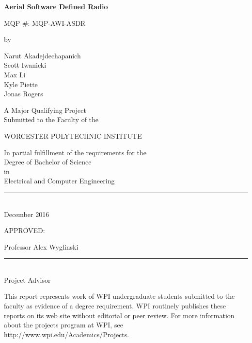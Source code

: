 \documentclass[12pt]{report}
\begin{document}
	
	
	
	\newcommand{\brk}{\vspace*{0.18in}}
	
	\thispagestyle{empty}
	
	\begin{center}
		
		\brk
		
		
		{\large 
			\textbf{
				Aerial Software Defined Radio
			}
		}
		
		MQP \#: MQP-AWI-ASDR
		
		\brk
		by
		
		\brk
		Narut Akadejdechapanich\\Scott Iwanicki\\Max Li\\Kyle Piette\\Jonas Rogers
		
		\brk\brk
		A Major Qualifying Project\\
		Submitted to the Faculty of the 
		
		\brk
		WORCESTER POLYTECHNIC INSTITUTE
		
		\brk
		In partial fulfillment of the requirements for the\\
		Degree of Bachelor of Science\\
		in\\
		Electrical and Computer Engineering\\
				
		\brk\brk
		\rule{3in}{1.2pt}\\
		December 2016
		
	
	
	APPROVED:

	\vspace{0.5in}
	Professor Alex Wyglinski\\
	\brk
	\rule{3in}{0.8pt}\\
	Project Advisor 

	\brk\brk
	This report represents work of WPI undergraduate students submitted to the faculty as evidence of a degree requirement. WPI routinely publishes these reports on its web site without editorial or peer review. For more information about the projects program at WPI, see http://www.wpi.edu/Academics/Projects.
	\end{center}
	
\end{document}
